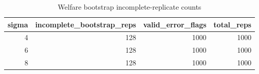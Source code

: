 \begin{table}

\caption{Welfare bootstrap incomplete-replicate counts}
\centering
\begin{tabular}[t]{rrrr}
\toprule
sigma & incomplete\_bootstrap\_reps & valid\_error\_flags & total\_reps\\
\midrule
4 & 128 & 1000 & 1000\\
6 & 128 & 1000 & 1000\\
8 & 128 & 1000 & 1000\\
\bottomrule
\end{tabular}
\end{table}
